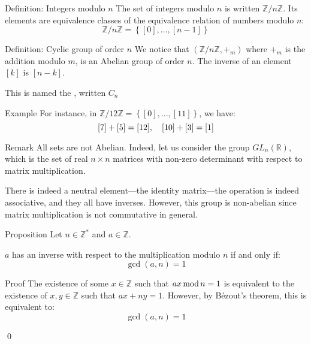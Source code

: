 \documentclass[a4paper]{article}
\begin{document}
\begin{parag}{Definition: Integers modulo $n$}
    The set of integers modulo $n$ is written $\mathbb{Z} / n\mathbb{Z}$. Its elements are equivalence classes of the equivalence relation of numbers modulo $n$: 
    \[\mathbb{Z} / n \mathbb{Z} = \left\{\left[0\right], \ldots, \left[n-1\right]\right\}\]
\end{parag}

\begin{parag}{Definition: Cyclic group of order $n$}
    We notice that $\left(\mathbb{Z} / n\mathbb{Z}, +_m\right)$ where $+_m$ is the addition modulo $m$, is an Abelian group of order $n$. The inverse of an element $\left[k\right]$ is $\left[n-k\right]$.

    This is named the , written $C_n$

    \begin{subparag}{Example}
        For instance, in $\mathbb{Z} / 12 \mathbb{Z} = \left\{\left[0\right], \ldots, \left[11\right]\right\}$, we have: 
        \[\left[7\right] + \left[5\right] = \left[12\right], \mathspace \left[10\right] + \left[3\right] = \left[1\right]\]
    \end{subparag}
\end{parag}

\begin{parag}{Remark}
    All sets are not Abelian. Indeed, let us consider the group $GL_{n}\left(\mathbb{R}\right)$, which is the set of real $n \times n$ matrices with non-zero determinant with respect to matrix multiplication.

    There is indeed a neutral element---the identity matrix---the operation is indeed associative, and they all have inverses. However, this group is non-abelian since matrix multiplication is not commutative in general. 
\end{parag}

\begin{parag}{Proposition}
    Let $n \in \mathbb{Z}^*$ and $a \in \mathbb{Z}$. 

    $a$ has an inverse with respect to the multiplication modulo $n$ if and only if: 
    \[\gcd\left(a, n\right) = 1\]
    
    \begin{subparag}{Proof}
        The existence of some $x \in \mathbb{Z}$ such that $ax \operatorname{mod} n = 1$ is equivalent to the existence of $x, y \in \mathbb{Z}$ such that $ax + ny = 1$. However, by Bézout's theorem, this is equivalent to: 
        \[\gcd\left(a, n\right) = 1\]

        \qed
    \end{subparag}
\end{parag}
\end{document}
